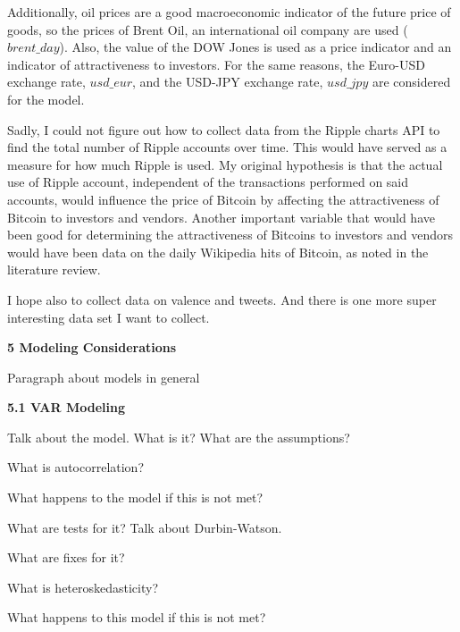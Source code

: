 \documentclass{article}[10 pt]
\newcommand{\vs}{\vspace{0.1in}}
\begin{document}
\vs

Additionally, oil prices are a good macroeconomic indicator of the future
price of goods, so the prices of Brent Oil, an international oil company are
used ($brent\_day$). Also, the value of the DOW Jones is used as a price
indicator and an indicator of attractiveness to investors. For the same
reasons, the Euro-USD exchange rate, $usd\_eur$, and the USD-JPY exchange
rate, $usd\_jpy$ are considered for the model.

\vs

Sadly, I could not figure out how to collect data from the Ripple charts API
to find the total number of Ripple accounts over time. This would have
served as a measure for how much Ripple is used. My original hypothesis is
that the actual use of Ripple account, independent of the transactions
performed on said accounts, would influence the price of Bitcoin by
affecting the attractiveness of Bitcoin to investors and vendors. Another
important variable that would have been good for determining the
attractiveness of Bitcoins to investors and vendors would have been data on
the daily Wikipedia hits of Bitcoin, as noted in the literature review.

\vs

I hope also to collect data on valence and tweets. And there is one more
super interesting data set I want to collect.

\vs

\textbf{5 Modeling Considerations}

\vs

Paragraph about models in general

\textbf{5.1 VAR Modeling}

\vs

Talk about the model. What is it? What are the assumptions?

\vs

What is autocorrelation?

\vs

What happens to the model if this is not met?

\vs

What are tests for it? Talk about Durbin-Watson.

\vs

What are fixes for it?

\vs

What is heteroskedasticity?

\vs

What happens to this model if this is not met?
\end{document}
